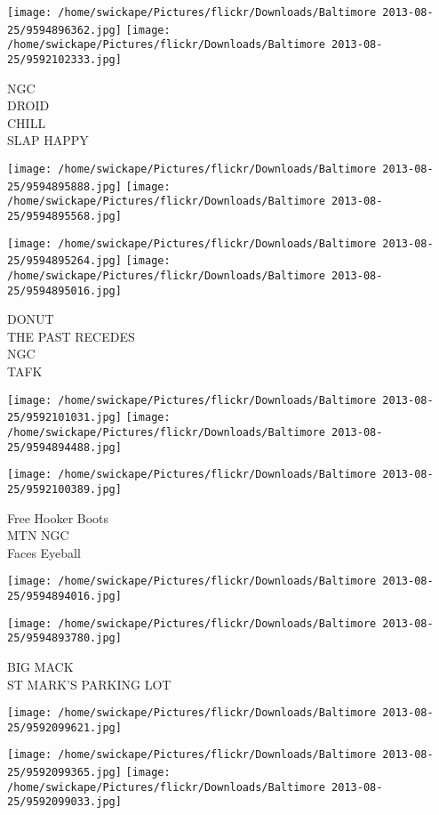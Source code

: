 \documentclass[10pt,letterpaper]{article}
\begin{document}
\texttt{[image: /home/swickape/Pictures/flickr/Downloads/Baltimore 2013-08-25/9594896362.jpg]}
\texttt{[image: /home/swickape/Pictures/flickr/Downloads/Baltimore 2013-08-25/9592102333.jpg]}

NGC\\
DROID\\
CHILL\\
SLAP HAPPY
\pagebreak

\texttt{[image: /home/swickape/Pictures/flickr/Downloads/Baltimore 2013-08-25/9594895888.jpg]}
\texttt{[image: /home/swickape/Pictures/flickr/Downloads/Baltimore 2013-08-25/9594895568.jpg]}

\texttt{[image: /home/swickape/Pictures/flickr/Downloads/Baltimore 2013-08-25/9594895264.jpg]}
\texttt{[image: /home/swickape/Pictures/flickr/Downloads/Baltimore 2013-08-25/9594895016.jpg]}

DONUT\\
THE PAST RECEDES\\
NGC\\
TAFK
\pagebreak

\texttt{[image: /home/swickape/Pictures/flickr/Downloads/Baltimore 2013-08-25/9592101031.jpg]}
\texttt{[image: /home/swickape/Pictures/flickr/Downloads/Baltimore 2013-08-25/9594894488.jpg]}

\texttt{[image: /home/swickape/Pictures/flickr/Downloads/Baltimore 2013-08-25/9592100389.jpg]}

Free Hooker Boots\\
MTN NGC\\
Faces Eyeball
\pagebreak

\texttt{[image: /home/swickape/Pictures/flickr/Downloads/Baltimore 2013-08-25/9594894016.jpg]}

\vspace{0.25in}
\texttt{[image: /home/swickape/Pictures/flickr/Downloads/Baltimore 2013-08-25/9594893780.jpg]}

BIG MACK\\
ST MARK'S PARKING LOT
\pagebreak

\texttt{[image: /home/swickape/Pictures/flickr/Downloads/Baltimore 2013-08-25/9592099621.jpg]}

\vspace{0.25in}
\texttt{[image: /home/swickape/Pictures/flickr/Downloads/Baltimore 2013-08-25/9592099365.jpg]}
\texttt{[image: /home/swickape/Pictures/flickr/Downloads/Baltimore 2013-08-25/9592099033.jpg]}
\end{document}
